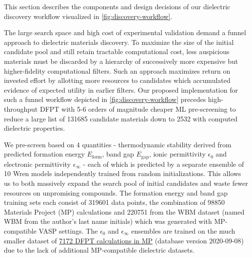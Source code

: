 \documentclass{article}
\newcommand{\egap}{{E_\text{gap}}}
\newcommand{\eform}{E_\text{form}}
\begin{document}
This section describes the components and design decisions of our dielectric discovery workflow visualized in \cref{fig:discovery-workflow}.

The large search space and high cost of experimental validation demand a funnel approach to dielectric materials discovery.
To maximize the size of the initial candidate pool and still retain tractable computational cost, less auspicious materials must be discarded by a hierarchy of successively more expensive but higher-fidelity computational filters.
Such an approach maximizes return on invested effort by allotting more resources to candidates which accumulated evidence of expected utility in earlier filters.
Our proposed implementation for such a funnel workflow depicted in \cref{fig:discovery-workflow} precedes high-throughput DFPT with 5-6 orders of magnitude cheaper ML pre-screening to reduce a large list of \num{131685} candidate materials down to \num{2532} with computed dielectric properties.

We pre-screen based on 4 quantities - thermodynamic stability derived from predicted formation energy $\eform$, band gap $\egap$, ionic permittivity $\epsilon_0$ and electronic permittivity $\epsilon_\infty$ - each of which is predicted by a separate ensemble of 10 Wren models \cite{goodall_rapid_2022} independently trained from random initializations.
This allows us to both massively expand the search pool of initial candidates and waste fewer resources on unpromising compounds.
The formation energy and band gap training sets each consist of \num{319 601} data points, the combination of \num{98 850} Materials Project (MP) \cite{jain_commentary_2013} calculations and \num{220 751} from the WBM dataset \cite{wang_predicting_2021} (named WBM from the author's last name initials) which was generated with MP-compatible VASP settings.
The $\epsilon_0$ and $\epsilon_\infty$ ensembles are trained on the much smaller dataset of \href{https://materialsproject.org/materials?has_props=dielectric}{\num{7172} DFPT calculations in MP} (database version 2020-09-08) due to the lack of additional MP-compatible dielectric datasets.
\end{document}
